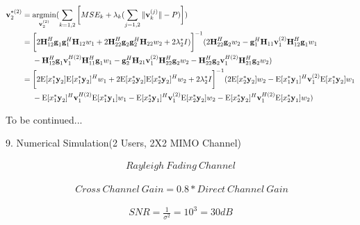 \documentclass[11pt, oneside]{article}   	%
\begin{document}
\begin{align*}
\textbf{v}^{*(2)}_{2} 	&= \operatornamewithlimits{argmin}_{\textbf{v}^{(2)}_{2}}	(\displaystyle\sum_{k=1,2} 	\bigg[	MSE_{k}	+	\lambda_{k}	(\displaystyle\sum_{j=1,2}	\|	\textbf{v}^{(j)}_{k}	\|	-P	)	\bigg])	\\
				   &= 	\bigg[ 2	\textbf{H}^{H}_{12}	\textbf{g}_{1}	\textbf{g}^{H}_{1}		\textbf{H}_{12}	w_1
				   +	2	\textbf{H}^{H}_{22}	\textbf{g}_{2}	\textbf{g}^{H}_{2}		\textbf{H}_{22}	w_2	+2	\lambda^{*}_2 I)
				   \bigg]^{-1} 
				   (2	\textbf{H}^{H}_{22}	\textbf{g}_{2}	w_2		
				   -	\textbf{g}^{H}_{1}	\textbf{H}_{11}	\textbf{v}^{(2)}_{1} 	\textbf{H}^{H}_{12}	\textbf{g}_{1} w_1	\\
				   &\ \ \ \ 
				   -	\textbf{H}^{H}_{12}	\textbf{g}_{1}	\textbf{v}^{H(2)}_{1}	\textbf{H}^{H}_{11}	\textbf{g}_{1}	w_1
				   -	\textbf{g}^{H}_{2}	\textbf{H}_{21}	\textbf{v}^{(2)}_{1} 	\textbf{H}^{H}_{22}	\textbf{g}_{2}	w_2
				   -	\textbf{H}^{H}_{22}	\textbf{g}_{2}	\textbf{v}^{H(2)}_{1}	\textbf{H}^{H}_{21}	\textbf{g}_{2}	w_2
				   )\\
				   &=\bigg[	2	\mathrm{E}[x^*_1	\textbf{y}_2]	\mathrm{E}[x^*_1	\textbf{y}_2]^H	w_1
			      			+	2	\mathrm{E}[x^*_2	\textbf{y}_2]	\mathrm{E}[x^*_2	\textbf{y}_2]^H	w_2	+2	\lambda^{*}_2 I
			      	  \bigg]^{-1} 
				  (2	\mathrm{E}[x^*_2	\textbf{y}_2]	w_2
				  -\mathrm{E}[x^*_1	\textbf{y}_1]^H	\textbf{v}^{(2)}_{1} 	\mathrm{E}[x^*_1	\textbf{y}_2]	w_1	\\
				  &\ \ \ \ 	
				  -\mathrm{E}[x^*_1	\textbf{y}_2]^H	\textbf{v}^{H(2)}_{1} 	\mathrm{E}[x^*_1	\textbf{y}_1]	w_1	
				  -\mathrm{E}[x^*_2	\textbf{y}_1]^H	\textbf{v}^{(2)}_{1} 	\mathrm{E}[x^*_2	\textbf{y}_2]	w_2
				   -\mathrm{E}[x^*_2	\textbf{y}_2]^H	\textbf{v}^{H(2)}_{1} 	\mathrm{E}[x^*_2	\textbf{y}_1]	w_2	
				   )
\end{align*}




To be continued...

\newpage

9. Numerical Simulation(2 Users, 2X2 MIMO Channel)


\begin{align*}
Rayleigh\ Fading\ Channel
\end{align*}

\begin{align*}
\ Cross\ Channel\ Gain = 0.8*Direct\ Channel\ Gain
\end{align*}

\begin{align*}
SNR = \frac {1}{\sigma^2} = 10^3=30dB
\end{align*}
\end{document}
